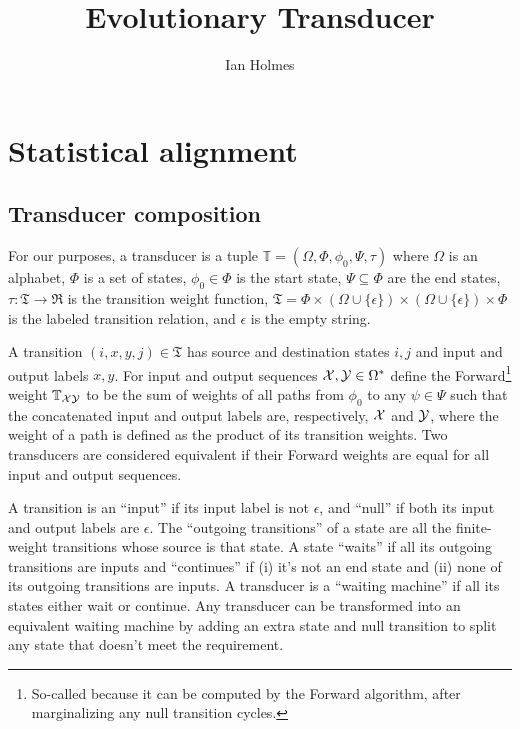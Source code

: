 \documentclass{article}
\title{Evolutionary Transducer}
\author{Ian Holmes}
\begin{document}

\section{Statistical alignment}

\subsection{Transducer composition}

\newcommand\gappedalphabet{(\Omega \cup \{\epsilon\})}

For our purposes, a transducer is a tuple
$\mathbb{T} = (\Omega, \Phi, \phi_0, \Psi, \tau)$
where
$\Omega$ is an alphabet,
$\Phi$ is a set of states,
$\phi_0 \in \Phi$ is the start state,
$\Psi \subseteq \Phi$ are the end states, 
$\tau:\mathfrak{T} \to \Re$ is the transition weight function,
$\mathfrak{T} = \Phi \times \gappedalphabet \times \gappedalphabet \times \Phi$ is the labeled transition relation,
and $\epsilon$ is the empty string.

A transition $(i,x,y,j) \in \mathfrak{T}$ has source and destination states $i,j$ and input and output labels $x,y$.
For input and output sequences ${\cal X}, {\cal Y} \in \Omega^\ast$
define the Forward\footnote{So-called because it can be computed by the Forward algorithm, after marginalizing any null transition cycles.} weight
$\mathbb{T}_{\cal XY}$ to be the sum of weights of all paths from $\phi_0$ to any $\psi \in \Psi$
such that the concatenated input and output labels are, respectively, ${\cal X}$ and ${\cal Y}$, where the weight of a path is defined as the product of its transition weights.
Two transducers are considered equivalent if their Forward weights are equal for all input and output sequences.

A transition is an ``input'' if its input label is not $\epsilon$, and ``null'' if both its input and output labels are $\epsilon$.
The ``outgoing transitions'' of a state are all the finite-weight transitions whose source is that state.
A state ``waits'' if all its outgoing transitions are inputs
and ``continues'' if (i) it's not an end state and (ii) none of its outgoing transitions are inputs.
A transducer is a ``waiting machine'' if all its states either wait or continue.
Any transducer can be transformed into an equivalent waiting machine by adding an extra state and null transition to split any state
that doesn't meet the requirement.
\end{document}
